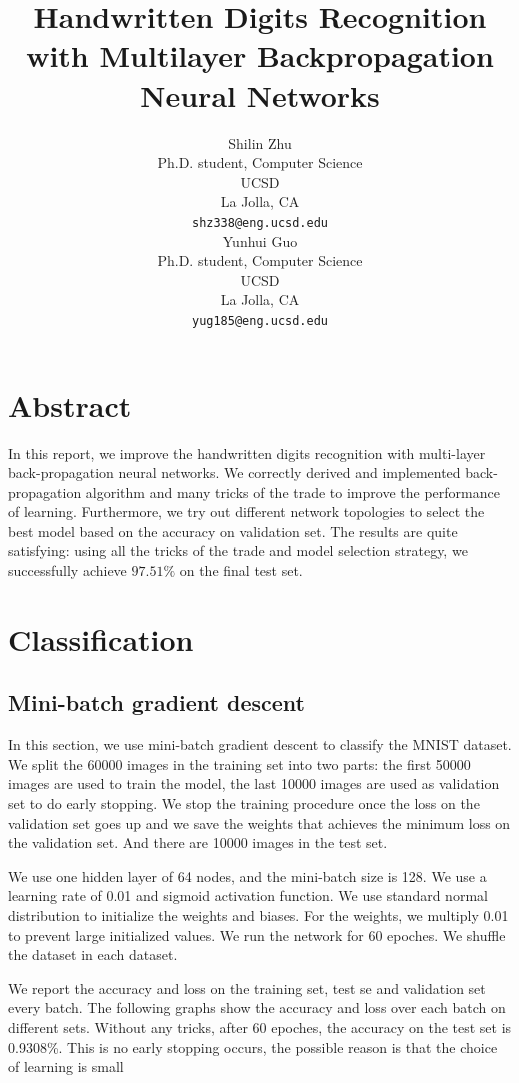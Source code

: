 \documentclass{article} %
\title{Handwritten Digits Recognition with Multilayer Backpropagation Neural Networks}
\author{
Shilin Zhu \\
Ph.D. student, Computer Science\\
UCSD\\
La Jolla, CA \\
\texttt{shz338@eng.ucsd.edu} \\
\And
Yunhui Guo\\
Ph.D. student, Computer Science\\
UCSD\\
La Jolla, CA \\
\texttt{yug185@eng.ucsd.edu} \\
}
\begin{document}
\maketitle
\section{Abstract}
In this report, we improve the handwritten digits recognition with multi-layer back-propagation neural networks. We correctly derived and implemented back-propagation algorithm and many tricks of the trade to improve the performance of learning. Furthermore, we try out different network topologies to select the best model based on the accuracy on validation set. The results are quite satisfying: using all the tricks of the trade and model selection strategy, we successfully achieve $97.51\%$ on the final test set.

\section{Classification}
\subsection{Mini-batch gradient descent}
In this section, we use mini-batch gradient descent to classify the MNIST dataset. We split the 60000 images in the training set into two parts: the first 50000 images are used to train the model, the last 10000 images are used as validation set to do early stopping. We stop the training procedure once the loss on the validation set goes up and we save the weights that achieves the minimum loss on the validation set. And there are 10000 images in the test set.

We use one hidden layer of 64 nodes, and the mini-batch size is 128. We use a learning rate of 0.01 and sigmoid activation function. We use standard normal distribution to initialize the weights and biases. For the weights, we multiply 0.01 to prevent large initialized values. We run the network for 60 epoches. We shuffle the dataset in each dataset.

We report the accuracy and loss on the training set, test se and validation set every batch. The following graphs show the accuracy and loss over each batch on different sets. Without any tricks, after 60 epoches, the accuracy on the test set is 0.9308\%. This is no early stopping occurs, the possible reason is that the choice of learning is small
\end{document}
